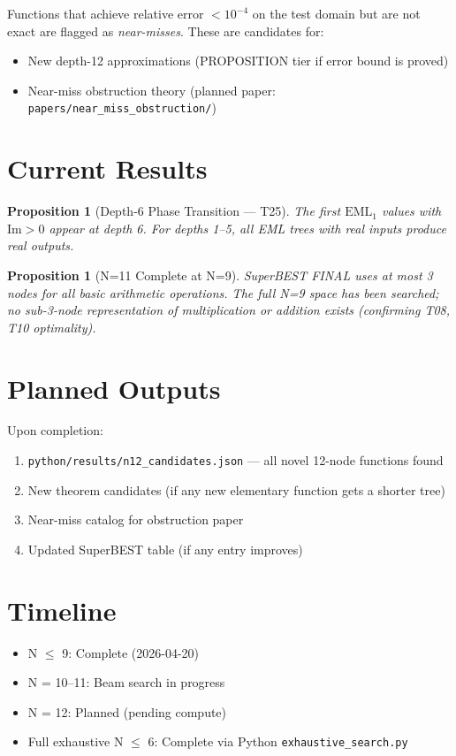 \documentclass[11pt]{article}
\newtheorem{proposition}[theorem]{Proposition}
\begin{document}
Functions that achieve relative error $< 10^{-4}$ on the test domain but are not exact
are flagged as \emph{near-misses}. These are candidates for:
\begin{itemize}
\item New depth-12 approximations (PROPOSITION tier if error bound is proved)
\item Near-miss obstruction theory (planned paper: \texttt{papers/near\_miss\_obstruction/})
\end{itemize}

\section{Current Results}

\begin{proposition}[Depth-6 Phase Transition — T25]
The first $\mathrm{EML}_1$ values with $\mathrm{Im} > 0$ appear at depth 6.
For depths 1--5, all EML trees with real inputs produce real outputs.
\end{proposition}

\begin{proposition}[N=11 Complete at N=9]
SuperBEST FINAL uses at most 3 nodes for all basic arithmetic operations.
The full N=9 space has been searched; no sub-3-node representation of multiplication
or addition exists (confirming T08, T10 optimality).
\end{proposition}

\section{Planned Outputs}

Upon completion:
\begin{enumerate}
\item \texttt{python/results/n12\_candidates.json} --- all novel 12-node functions found
\item New theorem candidates (if any new elementary function gets a shorter tree)
\item Near-miss catalog for obstruction paper
\item Updated SuperBEST table (if any entry improves)
\end{enumerate}

\section{Timeline}

\begin{itemize}
\item N $\leq$ 9: Complete (2026-04-20)
\item N = 10--11: Beam search in progress
\item N = 12: Planned (pending compute)
\item Full exhaustive N $\leq$ 6: Complete via Python \texttt{exhaustive\_search.py}
\end{itemize}
\end{document}
